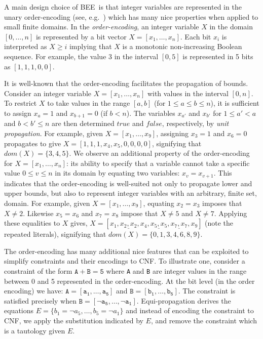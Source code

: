 \documentclass[runningheads,a4paper]{llncs}
\newcommand{\true}{\texttt{true}}
\newcommand{\false}{\mathit{false}}
\renewcommand{\true}{\mathit{true}}
\newcommand{\bee}{\textsf{BEE}}
\begin{document}
A main design choice of \bee\ is that integer variables are
represented in the unary order-encoding (see,
e.g.~\cite{baker,BailleuxB03}) which has many nice properties when
applied to small finite domains.
In the \emph{order-encoding}, an integer variable $X$ in the domain
$[0,\ldots,n]$ is represented by a bit vector $X=[x_1,\ldots,x_n]$.
Each bit $x_i$ is interpreted as $X\geq i$ implying that $X$
is a monotonic non-increasing Boolean sequence.
For example, the value 3 in the interval $[0,5]$ is represented in
5 bits as $[1,1,1,0,0]$.


It is well-known that the order-encoding facilitates the propagation
of bounds. Consider an integer variable $X=[x_1,\ldots,x_n]$ with
values in the interval $[0,n]$.  To restrict $X$ \pagebreak to take values in the
range $[a,b]$ (for $1\leq a\leq b\leq n$), it is sufficient to assign
$x_{a}=1$ and $x_{b+1}=0$ (if $b<n$). The variables $x_{a'}$ and
$x_{b'}$ for $1\leq a'< a$ and $b<b'\leq n$ are then determined $\true$
and $\false$, respectively, by \emph{unit propagation}.  For example, 
given $X=[x_1,\ldots,x_9]$, assigning $x_3=1$ and $x_6=0$ propagates
to give $X=[1,1,1,x_4,x_5,0,0,0,0]$, signifying that
$dom(X)=\{3,4,5\}$.
We observe an additional property of the order-encoding for
$X=[x_1,\ldots,x_n]$: its ability to specify that a variable cannot
take a specific value $0\leq v\leq n$ in its domain by equating two
variables: $x_{v}=x_{v+1}$.
This indicates that the order-encoding is well-suited not only to
propagate lower and upper bounds, but also to represent integer
variables with an arbitrary, finite set, domain.
For example, given $X=[x_1,\ldots,x_9]$, equating $x_2=x_3$ imposes
that $X\neq 2$. Likewise $x_5=x_6$ and $x_7=x_8$ impose that $X\neq 5$
and $X\neq 7$. Applying these equalities to $X$ gives,
$X=[x_1,\underline{x_2,x_2},x_4,\underline{x_5,x_5},\underline{x_7,x_7},x_9]$
(note the repeated literals),
signifying that $dom(X)=\{0,1,3,4,6,8,9\}$.


The order-encoding has many additional nice features that can be
exploited to simplify constraints and their encodings to CNF. To
illustrate one, consider a constraint of the form $\mathtt{A+B=5}$
where \texttt{A} and \texttt{B} are integer values in the range
between 0 and 5 represented in the order-encoding. At the bit level
(in the order encoding) we have: $\mathtt{A=[a_1,\ldots,a_5]}$ and
$\mathtt{B=[b_1,\ldots,b_5]}$.  The constraint is satisfied precisely
when $\mathtt{B=[\neg a_5,\ldots,\neg a_1]}$. Equi-propagation derives
the equations $E=\{b_1=\neg a_5,\ldots, b_5=\neg a_1\}$ and instead of
encoding the constraint to CNF, we apply the substitution indicated by
$E$, and remove the constraint which is a tautology given $E$.
\end{document}
